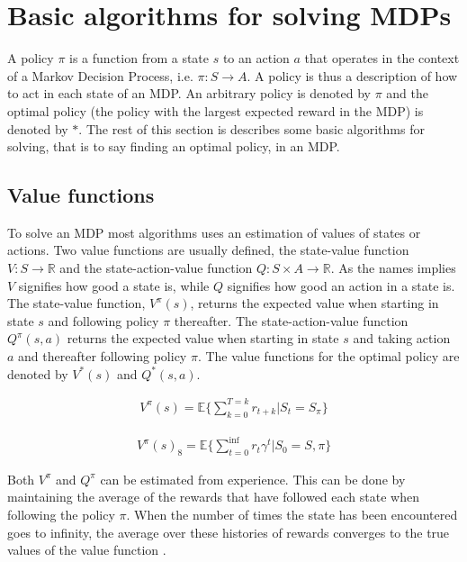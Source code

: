 \section{Basic algorithms for solving MDPs}

A policy $\pi$ is a function from a state $s$ to an action $a$ that operates in
the context of a Markov Decision Process, i.e. $\pi \colon S \to A$. A policy
is thus a description of how to act in each state of an MDP. An arbitrary
policy is denoted by $\pi$ and the optimal policy (the policy with the largest
expected reward in the MDP) is denoted by $*$. The rest of this section is
describes some basic algorithms for solving, that is to say finding an optimal
policy, in an MDP.

\subsection{Value functions}

To solve an MDP most algorithms uses an estimation of values of states or
actions. Two value functions are usually defined, the state-value function $V :
S \to \mathbb R$ and the state-action-value function $Q : S \times A \to
\mathbb R$. As the names implies $V$ signifies how good a state is, while $Q$
signifies how good an action in a state is. The state-value function,
$V^\pi(s)$, returns the expected value when starting in state $s$ and following
policy $\pi$ thereafter. The state-action-value function $Q^\pi(s, a)$ returns
the expected value when starting in state $s$ and taking action $a$ and
thereafter following policy $\pi$. The value functions for the optimal policy
are denoted by $V^*(s)$ and $Q^*(s, a)$. 

\begin{align}
\label{equation:v_finite}
V^\pi(s) = \mathbb{E} \{ \sum_{k=0}^{T=k} r_{t+k} | S_t = S_\pi \}
\end{align}

\begin{align}
\label{equation:v_infinite}
V^\pi(s)_8 = \mathbb{E} \{ \sum_{t=0}^\inf r_{t}\gamma^t | S_0 = S,\pi \}
\end{align}

Both $V^\pi$ and $Q^\pi$ can be estimated from experience. This can be done by
maintaining the average of the rewards that have followed each state when
following the policy $\pi$. When the number of times the state has been
encountered goes to infinity, the average over these histories of rewards
converges to the true values of the value function
\parencite{barto1998reinforcement}.






